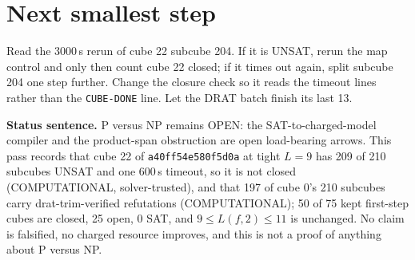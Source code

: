 \documentclass[11pt]{article}
\begin{document}
\section*{Next smallest step}
Read the 3000\,s rerun of cube 22 subcube 204. If it is UNSAT, rerun the map control and only then count cube 22 closed; if it times out again, split subcube 204 one step further. Change the closure check so it reads the timeout lines rather than the \texttt{CUBE-DONE} line. Let the DRAT batch finish its last 13.

\bigskip
\noindent\textbf{Status sentence.} P versus NP remains OPEN: the SAT-to-charged-model compiler and the product-span obstruction are open load-bearing arrows. This pass records that cube 22 of \texttt{a40ff54e580f5d0a} at tight $L=9$ has 209 of 210 subcubes UNSAT and one 600\,s timeout, so it is not closed (COMPUTATIONAL, solver-trusted), and that 197 of cube 0's 210 subcubes carry drat-trim-verified refutations (COMPUTATIONAL); 50 of 75 kept first-step cubes are closed, 25 open, 0 SAT, and $9\le L(f,2)\le 11$ is unchanged. No claim is falsified, no charged resource improves, and this is not a proof of anything about P versus NP.
\end{document}
